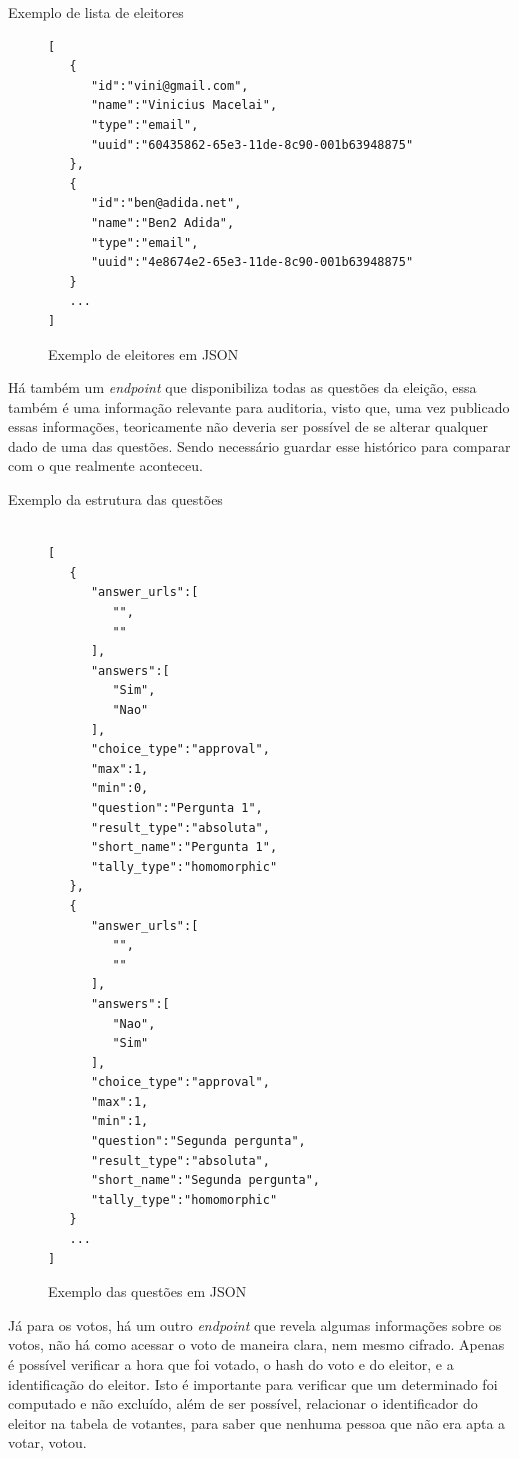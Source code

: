 \documentclass{ufsctex/ufsctex}
\begin{document}
Exemplo de lista de eleitores

\begin{figure}[H]
\centering
\begin{lstlisting}[numbers=none]
[
   {
      "id":"vini@gmail.com",
      "name":"Vinicius Macelai",
      "type":"email",
      "uuid":"60435862-65e3-11de-8c90-001b63948875"
   },
   {
      "id":"ben@adida.net",
      "name":"Ben2 Adida",
      "type":"email",
      "uuid":"4e8674e2-65e3-11de-8c90-001b63948875"
   }
   ...
]
\end{lstlisting}
	\caption{Exemplo de eleitores em JSON}
\end{figure}

Há também um \textit{endpoint} que disponibiliza todas as questões da eleição,
essa também é uma informação relevante para auditoria, visto que, uma vez
publicado essas informações, teoricamente não deveria ser possível de se
alterar qualquer dado de uma das questões. Sendo necessário guardar esse
histórico para comparar com o que realmente aconteceu.

Exemplo da estrutura das questões

\begin{figure}[H]
\begin{lstlisting}[numbers=none]

[
   {
      "answer_urls":[
         "",
         ""
      ],
      "answers":[
         "Sim",
         "Nao"
      ],
      "choice_type":"approval",
      "max":1,
      "min":0,
      "question":"Pergunta 1",
      "result_type":"absoluta",
      "short_name":"Pergunta 1",
      "tally_type":"homomorphic"
   },
   {
      "answer_urls":[
         "",
         ""
      ],
      "answers":[
         "Nao",
         "Sim"
      ],
      "choice_type":"approval",
      "max":1,
      "min":1,
      "question":"Segunda pergunta",
      "result_type":"absoluta",
      "short_name":"Segunda pergunta",
      "tally_type":"homomorphic"
   }
   ...
]

\end{lstlisting}
	\caption{Exemplo das questões em JSON}
\end{figure}

Já para os votos, há um outro \textit{endpoint} que revela algumas informações
sobre os votos, não há como acessar o voto de maneira clara, nem mesmo cifrado.
Apenas é possível verificar a hora que foi votado, o hash do voto e do eleitor,
e a identificação do eleitor. Isto é importante para verificar que um
determinado foi computado e não excluído, além de ser possível, relacionar o
identificador do eleitor na tabela de votantes, para saber que nenhuma pessoa
que não era apta a votar, votou.
\end{document}
